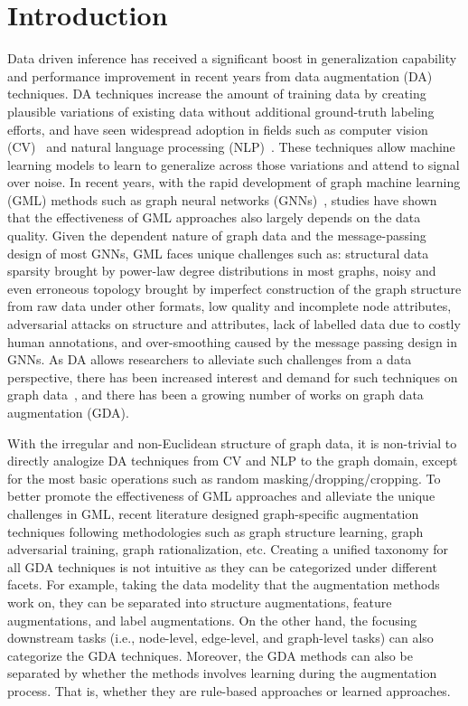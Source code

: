 \documentclass[11pt]{article}
\begin{document}
\section{Introduction}
\label{sec:intro}
\noindent Data driven inference has received a significant boost in generalization capability and performance improvement in recent years from data augmentation (DA) techniques. DA techniques increase the amount of training data by creating plausible variations of existing data without additional ground-truth labeling efforts, and have seen widespread adoption in fields such as computer vision (CV)~\cite{cubuk2019autoaugment} and natural language processing (NLP)~\cite{feng2021survey}. These techniques allow machine learning models to learn to generalize across those variations and attend to signal over noise.
In recent years, with the rapid development of graph machine learning (GML) methods such as graph neural networks (GNNs)~\cite{kipf2016semi,hamilton2017inductive}, studies have shown that the effectiveness of GML approaches also largely depends on the data quality. Given the dependent nature of graph data and the message-passing design of most GNNs, GML faces unique challenges such as: structural data sparsity brought by power-law degree distributions in most graphs, noisy and even erroneous topology brought by imperfect construction of the graph structure from raw data under other formats, low quality and incomplete node attributes, adversarial attacks on structure and attributes, lack of labelled data due to costly human annotations, and over-smoothing caused by the message passing design in GNNs.
As DA allows researchers to alleviate such challenges from a data perspective, there has been increased interest and demand for such techniques on graph data~\cite{zhao2021data}, and there has been a growing number of works on graph data augmentation (GDA).

With the irregular and non-Euclidean structure of graph data, it is non-trivial to directly analogize DA techniques from CV and NLP to the graph domain, except for the most basic operations such as random masking/dropping/cropping. To better promote the effectiveness of GML approaches and alleviate the unique challenges in GML, recent literature designed graph-specific augmentation techniques following methodologies such as graph structure learning, graph adversarial training, graph rationalization, etc.
Creating a unified taxonomy for all GDA techniques is not intuitive as they can be categorized under different facets. 
For example, taking the data modelity that the augmentation methods work on, they can be separated into structure augmentations, feature augmentations, and label augmentations. On the other hand, the focusing downstream tasks (i.e., node-level, edge-level, and graph-level tasks) can also categorize the GDA techniques. Moreover, the GDA methods can also be separated by whether the methods involves learning during the augmentation process. That is, whether they are rule-based approaches or learned approaches.
\end{document}
